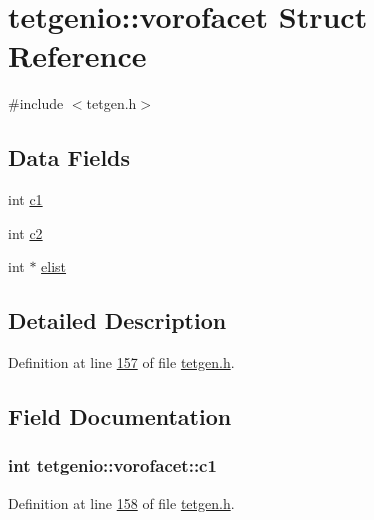 \hypertarget{structtetgenio_1_1vorofacet}{}\section{tetgenio\+:\+:vorofacet Struct Reference}
\label{structtetgenio_1_1vorofacet}


{\ttfamily \#include $<$tetgen.\+h$>$}

\subsection*{Data Fields}
\begin{DoxyCompactItemize}
\item 
int \hyperlink{structtetgenio_1_1vorofacet_a69fcc657a17f0e4565d734fbb34b3239}{c1}
\item 
int \hyperlink{structtetgenio_1_1vorofacet_a368f7dcb47dc65f5655570e942f1e414}{c2}
\item 
int $\ast$ \hyperlink{structtetgenio_1_1vorofacet_a7dc623ea5f4a6006fcc20b2bc8a1f560}{elist}
\end{DoxyCompactItemize}


\subsection{Detailed Description}


Definition at line \hyperlink{tetgen_8h_source_l00157}{157} of file \hyperlink{tetgen_8h_source}{tetgen.\+h}.



\subsection{Field Documentation}
\subsubsection[{\texorpdfstring{c1}{c1}}]{\setlength{\rightskip}{0pt plus 5cm}int tetgenio\+::vorofacet\+::c1}\hypertarget{structtetgenio_1_1vorofacet_a69fcc657a17f0e4565d734fbb34b3239}{}\label{structtetgenio_1_1vorofacet_a69fcc657a17f0e4565d734fbb34b3239}


Definition at line \hyperlink{tetgen_8h_source_l00158}{158} of file \hyperlink{tetgen_8h_source}{tetgen.\+h}.

